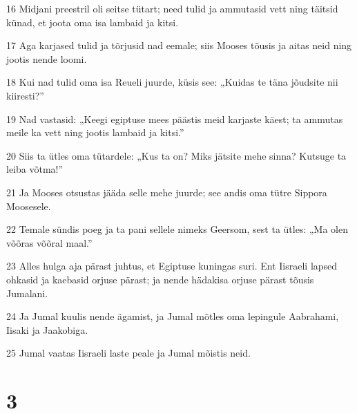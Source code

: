 \par 16 Midjani preestril oli seitse tütart; need tulid ja ammutasid vett ning täitsid künad, et joota oma isa lambaid ja kitsi.
\par 17 Aga karjased tulid ja tõrjusid nad eemale; siis Mooses tõusis ja aitas neid ning jootis nende loomi.
\par 18 Kui nad tulid oma isa Reueli juurde, küsis see: „Kuidas te täna jõudsite nii kiiresti?”
\par 19 Nad vastasid: „Keegi egiptuse mees päästis meid karjaste käest; ta ammutas meile ka vett ning jootis lambaid ja kitsi.”
\par 20 Siis ta ütles oma tütardele: „Kus ta on? Miks jätsite mehe sinna? Kutsuge ta leiba võtma!”
\par 21 Ja Mooses otsustas jääda selle mehe juurde; see andis oma tütre Sippora Moosesele.
\par 22 Temale sündis poeg ja ta pani sellele nimeks Geersom, sest ta ütles: „Ma olen võõras võõral maal.”
\par 23 Alles hulga aja pärast juhtus, et Egiptuse kuningas suri. Ent Iisraeli lapsed ohkasid ja kaebasid orjuse pärast; ja nende hädakisa orjuse pärast tõusis Jumalani.
\par 24 Ja Jumal kuulis nende ägamist, ja Jumal mõtles oma lepingule Aabrahami, Iisaki ja Jaakobiga.
\par 25 Jumal vaatas Iisraeli laste peale ja Jumal mõistis neid.

\chapter{3}

